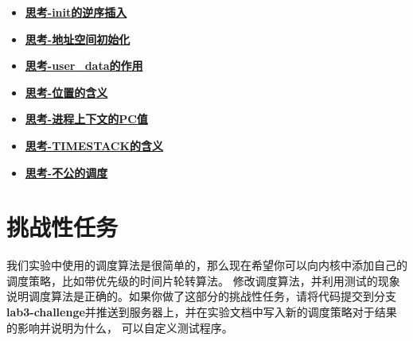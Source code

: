 \begin{itemize}
\item \hyperref[think-env_init]{\textbf{\textcolor{baseB}{思考-init的逆序插入}}}
\item \hyperref[think-env_setup_vm]{\textbf{\textcolor{baseB}{思考-地址空间初始化}}}
\item \hyperref[think-user-data]{\textbf{\textcolor{baseB}{思考-user\_data的作用}}}
\item \hyperref[think-位置]{\textbf{\textcolor{baseB}{思考-位置的含义}}}
\item \hyperref[think-pc]{\textbf{\textcolor{baseB}{思考-进程上下文的PC值}}}
\item \hyperref[think-TIMESTACK]{\textbf{\textcolor{baseB}{思考-TIMESTACK的含义}}}
\item \hyperref[think-调度]{\textbf{\textcolor{baseB}{思考-不公的调度}}}
\end{itemize}

\section{挑战性任务}
我们实验中使用的调度算法是很简单的，那么现在希望你可以向内核中添加自己的调度策略，比如带优先级的时间片轮转算法。
修改调度算法，并利用测试的现象说明调度算法是正确的。如果你做了这部分的挑战性任务，请将代码提交到分支
\textbf{lab3-challenge}并推送到服务器上，并在实验文档中写入新的调度策略对于结果的影响并说明为什么，
可以自定义测试程序。